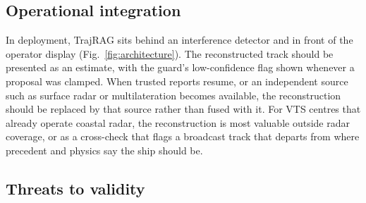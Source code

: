 \subsection{Operational integration}

In deployment, TrajRAG sits behind an interference detector and in front of
the operator display (Fig.~\ref{fig:architecture}). The reconstructed track
should be presented as an estimate, with the guard's low-confidence flag
shown whenever a proposal was clamped. When trusted reports resume, or an
independent source such as surface radar or multilateration becomes
available, the reconstruction should be replaced by that source rather than
fused with it. For VTS centres that already operate coastal radar, the
reconstruction is most valuable outside radar coverage, or as a cross-check
that flags a broadcast track that departs from where precedent and physics
say the ship should be.

\subsection{Threats to validity}
\label{sec:threats}

